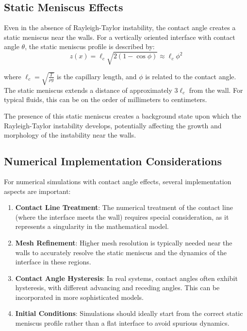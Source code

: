 \documentclass[12pt,a4paper]{article}
\begin{document}
\subsection{Static Meniscus Effects}
Even in the absence of Rayleigh-Taylor instability, the contact angle creates a static meniscus near the walls. For a vertically oriented interface with contact angle $\theta$, the static meniscus profile is described by:
\begin{equation}
z(x) = \ell_c\sqrt{2(1-\cos\phi)} \approx \ell_c\phi^2
\end{equation}

where $\ell_c = \sqrt{\frac{T}{\rho g}}$ is the capillary length, and $\phi$ is related to the contact angle. The static meniscus extends a distance of approximately $3\ell_c$ from the wall. For typical fluids, this can be on the order of millimeters to centimeters.

The presence of this static meniscus creates a background state upon which the Rayleigh-Taylor instability develops, potentially affecting the growth and morphology of the instability near the walls.

\subsection{Numerical Implementation Considerations}
For numerical simulations with contact angle effects, several implementation aspects are important:

\begin{enumerate}
    \item \textbf{Contact Line Treatment}: The numerical treatment of the contact line (where the interface meets the wall) requires special consideration, as it represents a singularity in the mathematical model.
    
    \item \textbf{Mesh Refinement}: Higher mesh resolution is typically needed near the walls to accurately resolve the static meniscus and the dynamics of the interface in these regions.
    
    \item \textbf{Contact Angle Hysteresis}: In real systems, contact angles often exhibit hysteresis, with different advancing and receding angles. This can be incorporated in more sophisticated models.
    
    \item \textbf{Initial Conditions}: Simulations should ideally start from the correct static meniscus profile rather than a flat interface to avoid spurious dynamics.
\end{enumerate}
\end{document}
